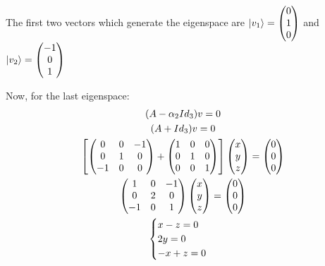 \documentclass[12pt]{article}
\begin{document}
\begin{enumerate}
The first two vectors which generate the eigenspace are 
$
\ket{v_1} = 
\begin{pmatrix}
    0 \\
    1 \\
    0
\end{pmatrix}
$
and
$
\ket{v_2} = 
\begin{pmatrix}
    -1 \\
    0 \\
    1
\end{pmatrix}
$

Now, for the last eigenspace:
\begin{gather*}
(A-\alpha_2 Id_3)v=0 \\
(A+Id_3)v=0 \\
\mqty[
\begin{pmatrix}
    0 & 0 & -1 \\ 0 & 1 & 0 \\ -1 & 0 & 0
\end{pmatrix}
+
\begin{pmatrix}
    1 & 0 & 0 \\ 0 & 1 & 0 \\ 0 & 0 & 1
\end{pmatrix}]
\begin{pmatrix}
    x \\ y \\ z
\end{pmatrix}
=
\begin{pmatrix}
    0 \\ 0 \\ 0
\end{pmatrix} \\
\begin{pmatrix}
    1 & 0 & -1 \\ 0 & 2 & 0 \\ -1 & 0 & 1
\end{pmatrix}
\begin{pmatrix}
    x \\ y \\ z
\end{pmatrix}
=
\begin{pmatrix}
    0 \\ 0 \\ 0
\end{pmatrix} \\
\begin{cases}
    x-z=0\\
    2y=0\\
    -x+z=0
\end{cases}

\end{gather*}
\end{enumerate}
\end{document}
